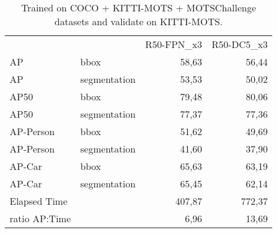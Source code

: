\documentclass[12pt,a4paper,twocolumn,twoside]{article}
\begin{document}
\begin{table}[]
    \centering
\begin{tabular}{|l|l|r|r|} \cline{1-4}
              &              & \multicolumn{1}{l|}{R50-FPN\_x3} & \multicolumn{1}{l|}{R50-DC5\_x3} \\ \cline{1-4}
AP            & bbox         & 58,63                            & 56,44                            \\ \cline{1-4}
AP            & segmentation & 53,53                            & 50,02                            \\ \cline{1-4}
AP50          & bbox         & 79,48                            & 80,06                            \\ \cline{1-4}
AP50          & segmentation & 77,37                            & 77,36                            \\ \cline{1-4}
AP-Person     & bbox         & 51,62                            & 49,69                            \\ \cline{1-4}
AP-Person     & segmentation & 41,60                            & 37,90                            \\ \cline{1-4}
AP-Car        & bbox         & 65,63                            & 63,19                            \\ \cline{1-4}
AP-Car        & segmentation & 65,45                            & 62,14                            \\ \cline{1-4}
Elapsed Time  &              & 407,87                           & 772,37                           \\ \cline{1-4}
ratio AP:Time &              & 6,96                             & 13,69                            \\ \cline{1-4} 
\end{tabular}
\caption{\label{table:task_b_COCO_motschallenge}Trained on COCO + KITTI-MOTS + MOTSChallenge datasets and validate on KITTI-MOTS.}
\end{table}
\end{document}
